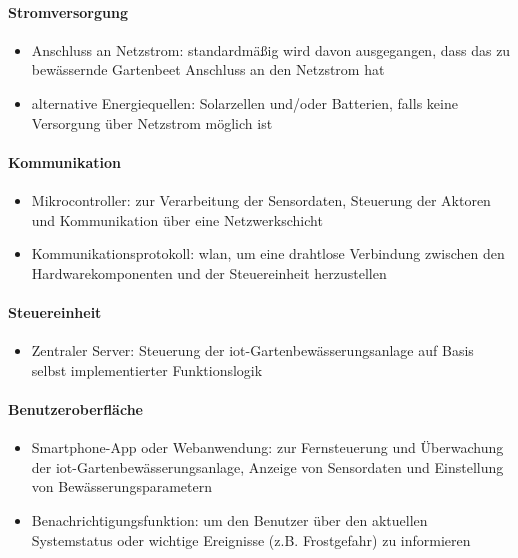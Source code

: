 \paragraph{Stromversorgung}
\begin{itemize}
  \item Anschluss an Netzstrom: standardmäßig wird davon ausgegangen, dass das zu bewässernde Gartenbeet Anschluss an den Netzstrom hat
  \item alternative Energiequellen: Solarzellen und/oder Batterien, falls keine Versorgung über Netzstrom möglich ist
\end{itemize}

\paragraph{Kommunikation}
\begin{itemize}
  \item Mikrocontroller: zur Verarbeitung der Sensordaten, Steuerung der Aktoren und Kommunikation über eine Netzwerkschicht
  \item Kommunikationsprotokoll: \gls{wlan}, um eine drahtlose Verbindung zwischen den Hardwarekomponenten und der Steuereinheit herzustellen
\end{itemize}

\paragraph{Steuereinheit}
\begin{itemize}
  \item Zentraler Server: Steuerung der \gls{iot}-Gartenbewässerungsanlage auf Basis selbst implementierter Funktionslogik
\end{itemize}

\paragraph{Benutzeroberfläche}
\begin{itemize}
  \item Smartphone-App oder Webanwendung: zur Fernsteuerung und Überwachung der \gls{iot}-Gartenbewässerungsanlage, Anzeige von Sensordaten und Einstellung von Bewässerungsparametern
  \item Benachrichtigungsfunktion: um den Benutzer über den aktuellen Systemstatus oder wichtige Ereignisse (z.B. Frostgefahr) zu informieren
\end{itemize}

